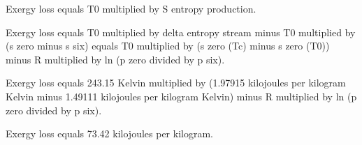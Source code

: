 Exergy loss equals T0 multiplied by S entropy production.  

Exergy loss equals T0 multiplied by delta entropy stream minus T0 multiplied by (s zero minus s six) equals T0 multiplied by (s zero (Tc) minus s zero (T0)) minus R multiplied by ln (p zero divided by p six).  

Exergy loss equals 243.15 Kelvin multiplied by (1.97915 kilojoules per kilogram Kelvin minus 1.49111 kilojoules per kilogram Kelvin) minus R multiplied by ln (p zero divided by p six).  

Exergy loss equals 73.42 kilojoules per kilogram.